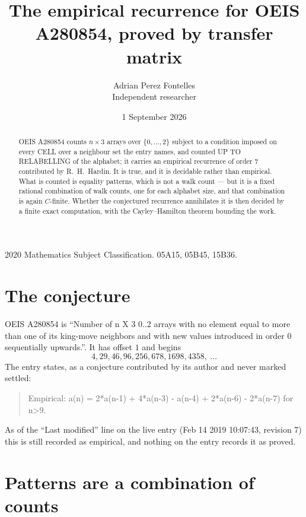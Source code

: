 \documentclass[11pt,a4paper]{article}
\title{The empirical recurrence for OEIS A280854, proved by transfer matrix}
\author{Adrian Perez Fontelles\\ \small Independent researcher}
\date{1 September 2026}
\theoremstyle{plain}
\theoremstyle{definition}
\begin{document}
\maketitle

\begin{abstract}
OEIS A280854 counts $n\times3$ arrays over $\{0,\dots,2\}$ subject to a condition imposed on
every CELL over a neighbour set the entry names, and counted UP TO RELABELLING of the
alphabet; it carries an empirical recurrence of order $7$ contributed by
R.~H.~Hardin. It is true, and it is decidable rather than empirical. What is counted is
equality patterns, which is not a walk count --- but it is a fixed rational combination of
walk counts, one for each alphabet size, and that combination is again $C$-finite. Whether the
conjectured recurrence annihilates it is then decided by a finite exact computation, with the
Cayley--Hamilton theorem bounding the work.
\end{abstract}

\noindent\small 2020 Mathematics Subject Classification. 05A15, 05B45, 15B36.\normalsize

\section{The conjecture}

OEIS A280854 is ``Number of n X 3 0..2 arrays with no element equal to more than one of its king-move neighbors and with new values introduced in order 0 sequentially upwards.''. It has offset $1$ and begins
\[
4, 29, 46, 96, 256, 678, 1698, 4358,\ \dots
\]
The entry states, as a conjecture contributed by its author and never marked settled:
\begin{quote}
Empirical: a(n) = 2*a(n-1) + 4*a(n-3) - a(n-4) + 2*a(n-6) - 2*a(n-7) for n>9.
\end{quote}
As of the ``Last modified'' line on the live entry (Feb 14 2019 10:07:43, revision 7) this is still
recorded as empirical, and nothing on the entry records it as proved.

\section{Patterns are a combination of counts}
\end{document}
